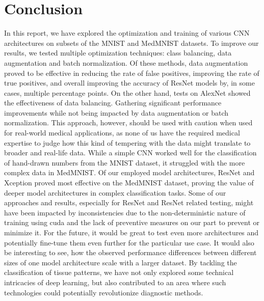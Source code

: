 \section{Conclusion}\label{conclusion}

In this report, we have explored the optimization and training of various CNN architectures on subsets of the MNIST and MedMNIST datasets. To improve our results, we tested multiple optimization techniques: class balancing, data augmentation and batch normalization. Of these methods, data augmentation proved to be effective in reducing the rate of false positives, improving the rate of true positives, and overall improving the accuracy of ResNet models by, in some cases, multiple percentage points. On the other hand, tests on AlexNet showed the effectiveness of data balancing. Gathering significant performance improvements while not being impacted by data augmentation or batch normalization. This approach, however, should be used with caution when used for real-world medical applications, as none of us have the required medical expertise to judge how this kind of tempering with the data might translate to broader and real-life data. While a simple CNN worked well for the classification of hand-drawn numbers from the MNIST dataset, it struggled with the more complex data in MedMNIST\@. Of our employed model architectures, ResNet and Xception proved most effective on the MedMNIST dataset, proving the value of deeper model architectures in complex classification tasks. Some of our approaches and results, especially for ResNet and ResNet related testing, might have been impacted by inconsistencies due to the non-deterministic nature of training using cuda and the lack of preventive measures on our part to prevent or minimize it. For the future, it would be great to test even more architectures and potentially fine-tune them even further for the particular use case. It would also be interesting to see, how the observed performance differences between different sizes of one model architecture scale with a larger dataset. By tackling the classification of tissue patterns, we have not only explored some technical intricacies of deep learning, but also contributed to an area where such technologies could potentially revolutionize diagnostic methods.
